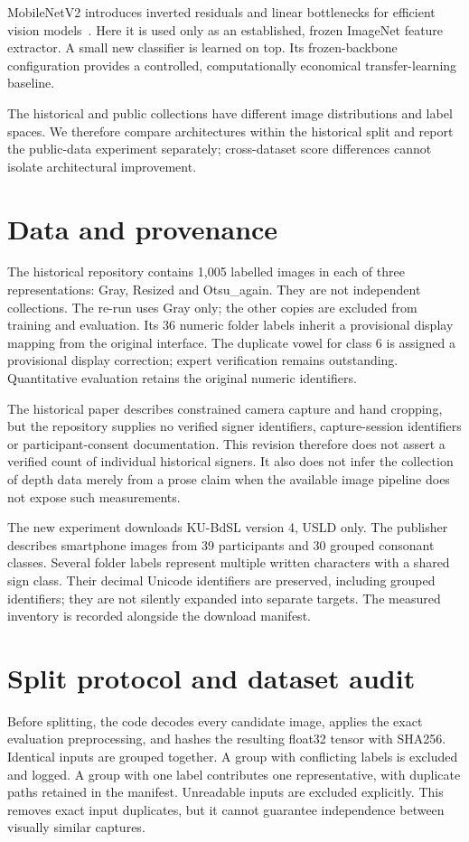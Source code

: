 \documentclass[11pt,a4paper]{article}
\begin{document}
MobileNetV2 introduces inverted residuals and linear bottlenecks for efficient vision models~\cite{mobilenet}. Here it is used only as an established, frozen ImageNet feature extractor. A small new classifier is learned on top. Its frozen-backbone configuration provides a controlled, computationally economical transfer-learning baseline.

The historical and public collections have different image distributions and label spaces. We therefore compare architectures within the historical split and report the public-data experiment separately; cross-dataset score differences cannot isolate architectural improvement.
\section{Data and provenance}
The historical repository contains 1,005 labelled images in each of three representations: Gray, Resized and Otsu\_again. They are not independent collections. The re-run uses Gray only; the other copies are excluded from training and evaluation. Its 36 numeric folder labels inherit a provisional display mapping from the original interface. The duplicate vowel for class 6 is assigned a provisional display correction; expert verification remains outstanding. Quantitative evaluation retains the original numeric identifiers.

The historical paper describes constrained camera capture and hand cropping, but the repository supplies no verified signer identifiers, capture-session identifiers or participant-consent documentation. This revision therefore does not assert a verified count of individual historical signers. It also does not infer the collection of depth data merely from a prose claim when the available image pipeline does not expose such measurements.

The new experiment downloads KU-BdSL version 4, USLD only. The publisher describes smartphone images from 39 participants and 30 grouped consonant classes. Several folder labels represent multiple written characters with a shared sign class. Their decimal Unicode identifiers are preserved, including grouped identifiers; they are not silently expanded into separate targets. The measured inventory is recorded alongside the download manifest.

\section{Split protocol and dataset audit}
Before splitting, the code decodes every candidate image, applies the exact evaluation preprocessing, and hashes the resulting float32 tensor with SHA256. Identical inputs are grouped together. A group with conflicting labels is excluded and logged. A group with one label contributes one representative, with duplicate paths retained in the manifest. Unreadable inputs are excluded explicitly. This removes exact input duplicates, but it cannot guarantee independence between visually similar captures.
\end{document}
